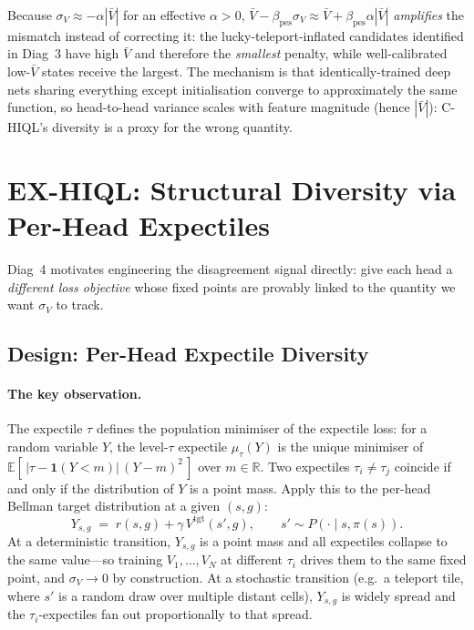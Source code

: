 \documentclass[11pt]{article}
\begin{document}
Because $\sigma_V \approx -\alpha|\bar V|$ for an effective $\alpha > 0$,
$\bar V - \beta_\text{pes}\sigma_V \approx \bar V + \beta_\text{pes}\alpha|\bar V|$
\emph{amplifies} the mismatch instead of correcting it: the
lucky-teleport-inflated candidates identified in Diag~3 have high
$\bar V$ and therefore the \emph{smallest} penalty, while well-calibrated
low-$\bar V$ states receive the largest.
The mechanism is that identically-trained deep nets sharing everything
except initialisation converge to approximately the same function, so
head-to-head variance scales with feature magnitude (hence $|\bar V|$):
C-HIQL's diversity is a proxy for the wrong quantity.

\section{EX-HIQL: Structural Diversity via Per-Head Expectiles}
\label{sec:exhiql}

Diag~4 motivates engineering the disagreement signal directly: give each
head a \emph{different loss objective} whose fixed points are provably
linked to the quantity we want $\sigma_V$ to track.

\subsection{Design: Per-Head Expectile Diversity}
\label{subsec:exhiql_design}

\paragraph{The key observation.}
The expectile $\tau$ defines the population minimiser of the expectile loss:
for a random variable $Y$, the level-$\tau$ expectile $\mu_\tau(Y)$ is the
unique minimiser of $\mathbb{E}[\,|\tau - \mathbf{1}(Y < m)|\,(Y-m)^2\,]$
over $m \in \mathbb{R}$.
Two expectiles $\tau_i \ne \tau_j$ coincide if and only if the distribution of
$Y$ is a point mass.
Apply this to the per-head Bellman target distribution at a given $(s,g)$:
\begin{equation}
  Y_{s,g} \;=\; r(s,g) + \gamma\,V^{\text{tgt}}(s',g),
  \qquad s' \sim P(\cdot \mid s, \pi(s)).
\end{equation}
At a deterministic transition, $Y_{s,g}$ is a point mass and all expectiles
collapse to the same value---so training $V_1, \ldots, V_N$ at different
$\tau_i$ drives them to the same fixed point, and $\sigma_V \to 0$ by
construction.
At a stochastic transition (e.g.\ a teleport tile, where $s'$ is a random
draw over multiple distant cells), $Y_{s,g}$ is widely spread and the
$\tau_i$-expectiles fan out proportionally to that spread.
\end{document}
